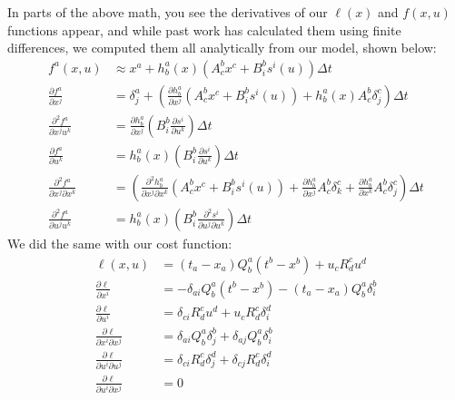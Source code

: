 \documentclass[a4paper,12pt]{article}
\begin{document}
In parts of the above math, you see the derivatives of our $\ell(x)$ and $f(x, u)$ functions appear, and while past work has calculated them using finite differences, we computed them all analytically from our model, shown below:
$$
\begin{aligned}
f^a(x, u) &\approx x^a+ h^a_b(x)(A^b_cx^c + B^b_is^i(u) )\Delta t\\
\frac{\partial f^a}{ \partial x^j} &= \delta ^a_j + \left (\frac {\partial h^a_b}{\partial x^j}(A^b_cx^c +B^b_is^i(u))  + h^a_b(x)A^b_c \delta^c_j\right )\Delta t\\
\frac{\partial^2 f^a}{\partial x^j u^k} &= \frac{\partial h^a_b}{\partial x^j}\left (B^b_i \frac{\partial s^i}{\partial u^k}\right)\Delta t\\
\frac{\partial f^a}{\partial u^k} &= h^a_b(x)\left (B^b_i\frac{\partial s^i}{\partial u^k}\right )\Delta t\\
\frac{\partial ^2f^a}{\partial x^j \partial x^k} &= \left (\frac{\partial ^2 h ^a_b}{\partial x^j \partial x^k}(A^b_cx^c +B^b_is^i(u)) + \frac{\partial h^a_b}{\partial x^j}A^b_c\delta^c_k+ \frac{\partial h^a_b}{\partial x^k}A^b_c\delta^c_j \right)\Delta t\\
\frac{\partial^2f^a}{\partial u^j u^k} &= h^a_b(x)\left (B^b_i\frac{\partial^2 s^i}{\partial u^j\partial u^k} \right )\Delta t
\end{aligned}
$$
We did the same with our cost function:
$$
\begin{aligned}
	\ell(x, u) &= (t_a - x_a )Q^a_b(t^b-x^b)+u_cR_d^cu^d\\
	\frac{\partial \ell}{\partial x^i} &=-\delta_{ai}Q^a_b(t^b-x^b)-(t_a-x_a)Q^a_b\delta_i^b\\
	\frac{\partial \ell}{\partial u^i} &=\delta_{ci}R^c_du^d+u_cR^c_d\delta_i^d\\
	\frac{\partial \ell}{\partial x^i \partial x^j} &= \delta_{ai} Q^a_b\delta^b_j + \delta_{aj}Q^a_b\delta^b_i\\
	\frac{\partial \ell}{\partial u^i \partial u^j} &= \delta_{ci} R^c_d\delta^d_j + \delta_{cj}R^c_d\delta^d_i\\
	\frac{\partial \ell}{\partial u^i \partial x^j} &=0
\end{aligned}
$$
\newpage
\end{document}
